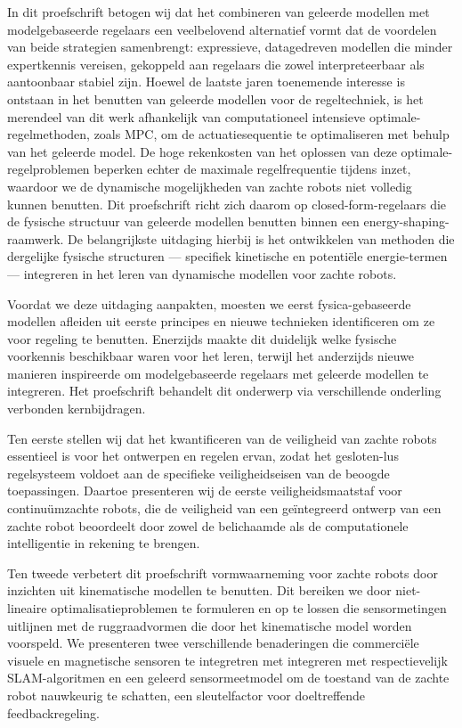 {In dit proefschrift betogen wij dat het combineren van geleerde modellen met modelgebaseerde regelaars een veelbelovend alternatief vormt dat de voordelen van beide strategien samenbrengt: expressieve, datagedreven modellen die minder expertkennis vereisen, gekoppeld aan regelaars die zowel interpreteerbaar als aantoonbaar stabiel zijn. Hoewel de laatste jaren toenemende interesse is ontstaan in het benutten van geleerde modellen voor de regeltechniek, is het merendeel van dit werk afhankelijk van computationeel intensieve optimale-regelmethoden, zoals MPC, om de actuatiesequentie te optimaliseren met behulp van het geleerde model. De hoge rekenkosten van het oplossen van deze optimale-regelproblemen beperken echter de maximale regelfrequentie tijdens inzet, waardoor we de dynamische mogelijkheden van zachte robots niet volledig kunnen benutten. Dit proefschrift richt zich daarom op closed-form-regelaars die de fysische structuur van geleerde modellen benutten binnen een energy-shaping-raamwerk. De belangrijkste uitdaging hierbij is het ontwikkelen van methoden die dergelijke fysische structuren — specifiek kinetische en potentiële energie-termen — integreren in het leren van dynamische modellen voor zachte robots.

Voordat we deze uitdaging aanpakten, moesten we eerst fysica-gebaseerde modellen afleiden uit eerste principes en nieuwe technieken identificeren om ze voor regeling te benutten. Enerzijds maakte dit duidelijk welke fysische voorkennis beschikbaar waren voor het leren, terwijl het anderzijds nieuwe manieren inspireerde om modelgebaseerde regelaars met geleerde modellen te integreren. Het proefschrift behandelt dit onderwerp via verschillende onderling verbonden kernbijdragen.

Ten eerste stellen wij dat het kwantificeren van de veiligheid van zachte robots essentieel is voor het ontwerpen en regelen ervan, zodat het gesloten-lus regelsysteem voldoet aan de specifieke veiligheidseisen van de beoogde toepassingen. Daartoe presenteren wij de eerste veiligheidsmaatstaf voor continuümzachte robots, die de veiligheid van een geïntegreerd ontwerp van een zachte robot beoordeelt door zowel de belichaamde als de computationele intelligentie in rekening te brengen.

Ten tweede verbetert dit proefschrift vormwaarneming voor zachte robots door inzichten uit kinematische modellen te benutten. Dit bereiken we door niet-lineaire optimalisatieproblemen te formuleren en op te lossen die sensormetingen uitlijnen met de ruggraadvormen die door het kinematische model worden voorspeld. We presenteren twee verschillende benaderingen die commerciële visuele en magnetische sensoren te integretren met integreren met respectievelijk SLAM-algoritmen en een geleerd sensormeetmodel om de toestand van de zachte robot nauwkeurig te schatten, een sleutelfactor voor doeltreffende feedbackregeling.

}
